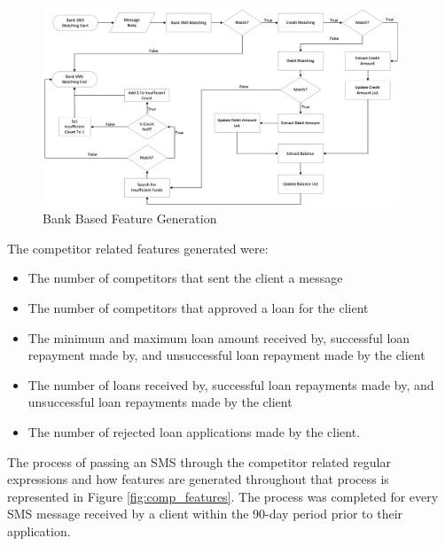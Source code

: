 \vspace{10pt}

\begin{figure}[!htb]
\centering
\includegraphics[width=0.95\textwidth]{images/bank_feats.png}
\caption{Bank Based Feature Generation}
\label{fig:bank_features}
\end{figure}

\vspace{10pt}

\newpage

The competitor related features generated were:

\begin{itemize}
    \item The number of competitors that sent the client a message
    \item The number of competitors that approved a loan for the client
    \item The minimum and maximum loan amount received by, successful loan repayment made by, and unsuccessful loan repayment made by the client
    \item The number of loans received by, successful loan repayments made by, and unsuccessful loan repayments made by the client
    \item The number of rejected loan applications made by the client. 
\end{itemize}

\vspace{10pt}

The process of passing an SMS through the competitor related regular expressions and how features are generated throughout that process is represented in Figure \ref{fig:comp_features}. The process was completed for every SMS message received by a client within the 90-day period prior to their application. 

\vspace{10pt}

